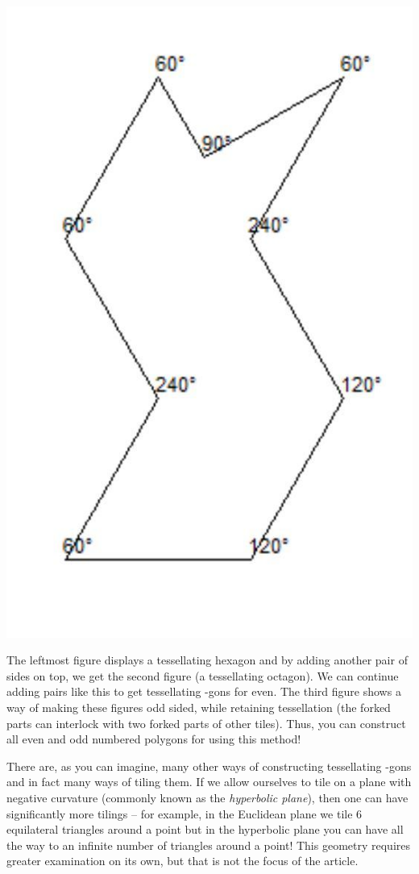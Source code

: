 \documentclass[1opt,a4paper]{article}
\begin{document}
\begin{multicols}{2}
\includegraphics[width=\linewidth]{image_5.jpg}

The leftmost figure displays a tessellating hexagon and by adding
another pair of sides on top, we get the second figure (a tessellating
octagon). We can continue adding pairs like this to get tessellating
-gons for even. The third figure shows a way of making these figures odd
sided, while retaining tessellation (the forked parts can interlock with
two forked parts of other tiles). Thus, you can construct all even and
odd numbered polygons for using this method!

There are, as you can imagine, many other ways of constructing
tessellating -gons and in fact many ways of tiling them. If we allow
ourselves to tile on a plane with negative curvature (commonly
known as the \emph{hyperbolic plane}), then one can have significantly
more tilings -- for example, in the Euclidean plane we tile 6
equilateral triangles around a point but in the hyperbolic plane you can
have all the way to an infinite number of triangles around a point! This
geometry requires greater examination on its own, but that is not the
focus of the article.


\end{multicols}
\end{document}
